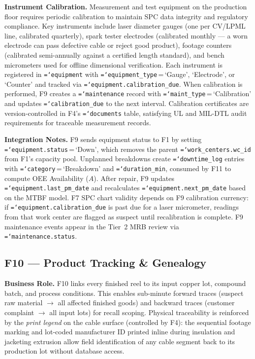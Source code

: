 \documentclass[11pt]{article}
\newcommand{\tfield}[1]{\texttt{\hyphenchar\font=`\-\relax #1}}
\begin{document}
\textbf{Instrument Calibration.}
Measurement and test equipment on the production floor requires periodic calibration to maintain SPC data integrity and regulatory compliance.  Key instruments include laser diameter gauges (one per CV/LPML line, calibrated quarterly), spark tester electrodes (calibrated monthly --- a worn electrode can pass defective cable or reject good product), footage counters (calibrated semi-annually against a certified length standard), and bench micrometers used for offline dimensional verification.  Each instrument is registered in \tfield{equipment} with \tfield{equipment\_type}\,=\,`Gauge', `Electrode', or `Counter' and tracked via \tfield{equipment.calibration\_due}.  When calibration is performed, F9 creates a \tfield{maintenance} record with \tfield{maint\_type}\,=\,`Calibration' and updates \tfield{calibration\_due} to the next interval.  Calibration certificates are version-controlled in F4's \tfield{documents} table, satisfying UL and MIL-DTL audit requirements for traceable measurement records.

\textbf{Integration Notes.}
F9 sends equipment status to F1 by setting \tfield{equipment.status}\,=\,`Down', which removes the parent \tfield{work\_centers.wc\_id} from F1's capacity pool.  Unplanned breakdowns create \tfield{downtime\_log} entries with \tfield{category}\,=\,`Breakdown' and \tfield{duration\_min}, consumed by F11 to compute OEE Availability ($A$).  After repair, F9 updates \tfield{equipment.last\_pm\_date} and recalculates \tfield{equipment.next\_pm\_date} based on the MTBF model.  F7 SPC chart validity depends on F9 calibration currency: if \tfield{equipment.\allowbreak calibration\_due} is past due for a laser micrometer, readings from that work center are flagged as suspect until recalibration is complete.  F9 maintenance events appear in the Tier~2 MRB review via \tfield{maintenance.status}.

\subsection{F10 --- Product Tracking \& Genealogy}

\textbf{Business Role.}
F10 links every finished reel to its input copper lot, compound batch, and process conditions.  This enables sub-minute forward traces (suspect raw material $\to$ all affected finished goods) and backward traces (customer complaint $\to$ all input lots) for recall scoping.  Physical traceability is reinforced by the \emph{print legend} on the cable surface (controlled by F4): the sequential footage marking and lot-coded manufacturer ID printed inline during insulation and jacketing extrusion allow field identification of any cable segment back to its production lot without database access.
\end{document}

